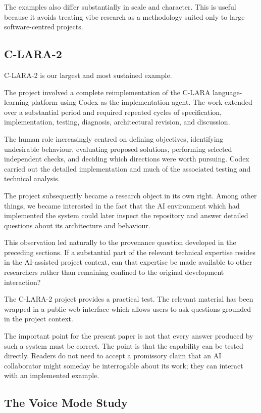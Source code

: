 The examples also differ substantially in scale and character. This is useful because it avoids treating vibe research as a methodology suited only to large software-centred projects.


\subsection{C-LARA-2}

C-LARA-2 is our largest and most sustained example.

The project involved a complete reimplementation of the C-LARA language-learning platform using Codex as the implementation agent. The work extended over a substantial period and required repeated cycles of specification, implementation, testing, diagnosis, architectural revision, and discussion.

The human role increasingly centred on defining objectives, identifying undesirable behaviour, evaluating proposed solutions, performing selected independent checks, and deciding which directions were worth pursuing. Codex carried out the detailed implementation and much of the associated testing and technical analysis.

The project subsequently became a research object in its own right. Among other things, we became interested in the fact that the AI environment which had implemented the system could later inspect the repository and answer detailed questions about its architecture and behaviour.

This observation led naturally to the provenance question developed in the preceding sections. If a substantial part of the relevant technical expertise resides in the AI-assisted project context, can that expertise be made available to other researchers rather than remaining confined to the original development interaction?

The C-LARA-2 project provides a practical test. The relevant material has been wrapped in a public web interface which allows users to ask questions grounded in the project context.

The important point for the present paper is not that every answer produced by such a system must be correct. The point is that the capability can be tested directly. Readers do not need to accept a promissory claim that an AI collaborator might someday be interrogable about its work; they can interact with an implemented example.


\subsection{The Voice Mode Study}


